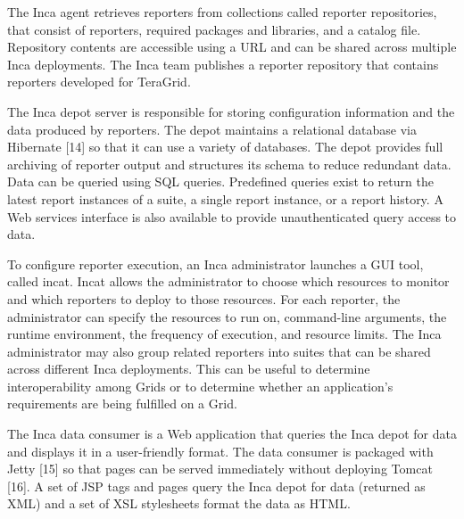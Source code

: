 \documentclass[times, 10pt,twocolumn]{article}
\begin{document}
The Inca agent retrieves reporters from collections called reporter
repositories, that consist of reporters, required packages and libraries,
and a catalog file. Repository contents are accessible using a URL and can
be shared across multiple Inca deployments. The Inca team publishes a
reporter repository that contains reporters developed for TeraGrid.  

The Inca depot server is responsible for storing configuration information
and the data produced by reporters. The depot maintains a relational
database via Hibernate [14] so that it can use a variety of databases.  The
depot provides full archiving of reporter output and structures its schema
to reduce redundant data.  Data can be queried using SQL queries. Predefined
queries exist to return the latest report instances of a suite, a single
report instance, or a report history.  A Web services interface is also
available to provide unauthenticated query access to data.  

To configure reporter execution, an Inca administrator launches a GUI tool,
called incat.  Incat allows the administrator to choose which resources to
monitor and which reporters to deploy to those resources.  For each
reporter, the administrator can specify the resources to run on,
command-line arguments, the runtime environment, the frequency of execution,
and resource limits. The Inca administrator may also group related reporters
into suites that can be shared across different Inca deployments.  This can
be useful to determine interoperability among Grids or to determine whether
an application's requirements are being fulfilled on a Grid.

The Inca data consumer is a Web application that queries the Inca depot for
data and displays it in a user-friendly format.  The data consumer is
packaged with Jetty [15] so that pages can be served immediately without
deploying Tomcat [16].  A set of JSP tags and pages query the Inca depot for
data (returned as XML) and a set of XSL stylesheets format the data as HTML.

~\newpage
~\newpage
~\newpage
~\newpage


~\newpage
~\newpage

~\newpage

~\newpage
~\newpage


~\newpage



\end{document}
